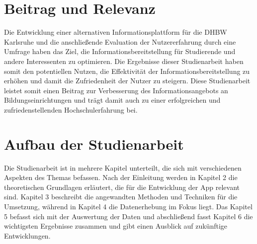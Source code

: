 \section{Beitrag und Relevanz}
Die Entwicklung einer alternativen Informationsplattform für die DHBW Karlsruhe und die anschließende Evaluation der Nutzererfahrung durch eine Umfrage haben das Ziel, die Informationsbereitstellung für Studierende und andere Interessenten zu optimieren. Die Ergebnisse dieser Studienarbeit haben somit den potentiellen Nutzen, die Effektivität der Informationsbereitstellung zu erhöhen und damit die Zufriedenheit der Nutzer zu steigern. Diese Studienarbeit leistet somit einen Beitrag zur Verbesserung des Informationsangebots an Bildungseinrichtungen und trägt damit auch zu einer erfolgreichen und zufriedenstellenden Hochschulerfahrung bei.

\section{Aufbau der Studienarbeit}

Die Studienarbeit ist in mehrere Kapitel unterteilt, die sich mit verschiedenen Aspekten des Themas befassen. Nach der Einleitung werden in Kapitel 2 die theoretischen Grundlagen erläutert, die für die Entwicklung der App relevant sind. Kapitel 3 beschreibt die angewandten Methoden und Techniken für die Umsetzung, während in Kapitel 4 die Datenerhebung im Fokus liegt. Das Kapitel 5 befasst sich mit der Auswertung der Daten und abschließend fasst Kapitel 6 die wichtigsten Ergebnisse zusammen und gibt einen Ausblick auf zukünftige Entwicklungen.
